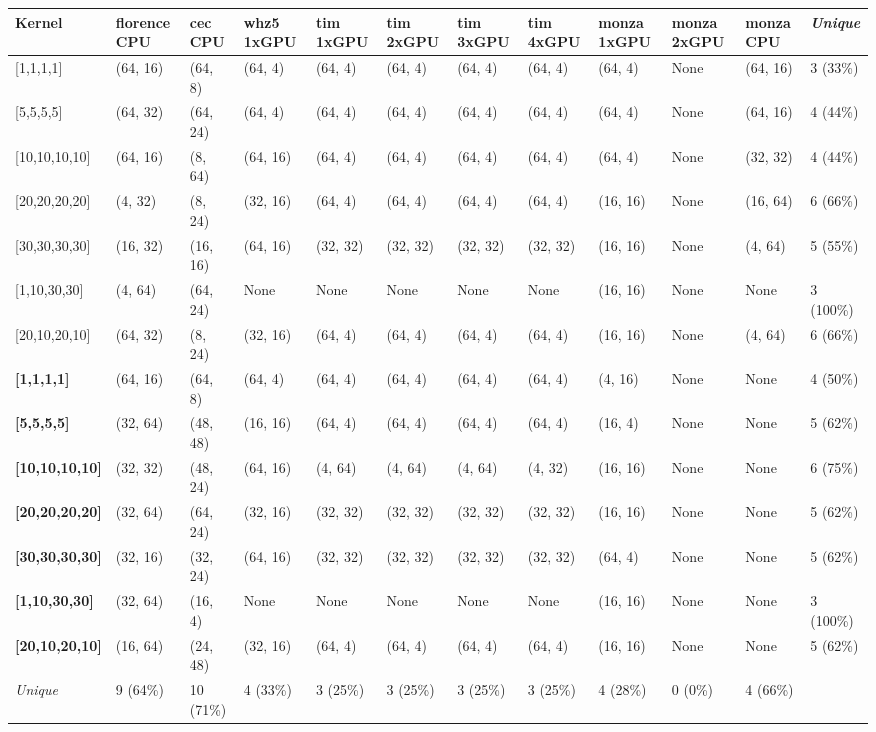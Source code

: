 \begin{tabular}{|p{1.8cm} | p{1cm} | p{1cm} | p{1cm} | p{1cm} | p{1cm} | p{1cm} | p{1cm} | p{1cm} | p{1cm} | p{1cm} | p{1.1cm}|}
\hline
\textbf{Kernel} & \textbf{florence CPU} & \textbf{cec CPU} & \textbf{whz5 1xGPU} & \textbf{tim 1xGPU} & \textbf{tim 2xGPU} & \textbf{tim 3xGPU} & \textbf{tim 4xGPU} & \textbf{monza 1xGPU} & \textbf{monza 2xGPU} & \textbf{monza CPU} & \textit{Unique}\\
\hline
{[}1,1,1,1{]} & (64, 16) & (64, 8) & (64, 4) & (64, 4) & (64, 4) & (64, 4) & (64, 4) & (64, 4) & None & (64, 16) & 3 (33\%)\\
{[}5,5,5,5{]} & (64, 32) & (64, 24) & (64, 4) & (64, 4) & (64, 4) & (64, 4) & (64, 4) & (64, 4) & None & (64, 16) & 4 (44\%)\\
{[}10,10,10,10{]} & (64, 16) & (8, 64) & (64, 16) & (64, 4) & (64, 4) & (64, 4) & (64, 4) & (64, 4) & None & (32, 32) & 4 (44\%)\\
{[}20,20,20,20{]} & (4, 32) & (8, 24) & (32, 16) & (64, 4) & (64, 4) & (64, 4) & (64, 4) & (16, 16) & None & (16, 64) & 6 (66\%)\\
{[}30,30,30,30{]} & (16, 32) & (16, 16) & (64, 16) & (32, 32) & (32, 32) & (32, 32) & (32, 32) & (16, 16) & None & (4, 64) & 5 (55\%)\\
{[}1,10,30,30{]} & (4, 64) & (64, 24) & None & None & None & None & None & (16, 16) & None & None & 3 (100\%)\\
{[}20,10,20,10{]} & (64, 32) & (8, 24) & (32, 16) & (64, 4) & (64, 4) & (64, 4) & (64, 4) & (16, 16) & None & (4, 64) & 6 (66\%)\\
\textbf{{[}1,1,1,1{]}} & (64, 16) & (64, 8) & (64, 4) & (64, 4) & (64, 4) & (64, 4) & (64, 4) & (4, 16) & None & None & 4 (50\%)\\
\textbf{{[}5,5,5,5{]}} & (32, 64) & (48, 48) & (16, 16) & (64, 4) & (64, 4) & (64, 4) & (64, 4) & (16, 4) & None & None & 5 (62\%)\\
\textbf{{[}10,10,10,10{]}} & (32, 32) & (48, 24) & (64, 16) & (4, 64) & (4, 64) & (4, 64) & (4, 32) & (16, 16) & None & None & 6 (75\%)\\
\textbf{{[}20,20,20,20{]}} & (32, 64) & (64, 24) & (32, 16) & (32, 32) & (32, 32) & (32, 32) & (32, 32) & (16, 16) & None & None & 5 (62\%)\\
\textbf{{[}30,30,30,30{]}} & (32, 16) & (32, 24) & (64, 16) & (32, 32) & (32, 32) & (32, 32) & (32, 32) & (64, 4) & None & None & 5 (62\%)\\
\textbf{{[}1,10,30,30{]}} & (32, 64) & (16, 4) & None & None & None & None & None & (16, 16) & None & None & 3 (100\%)\\
\textbf{{[}20,10,20,10{]}} & (16, 64) & (24, 48) & (32, 16) & (64, 4) & (64, 4) & (64, 4) & (64, 4) & (16, 16) & None & None & 5 (62\%)\\
\hline
\textit{Unique} & 9 (64\%) & 10 (71\%) & 4 (33\%) & 3 (25\%) & 3 (25\%) & 3 (25\%) & 3 (25\%) & 4 (28\%) & 0 (0\%) & 4 (66\%) & \\
\hline
\end{tabular}
